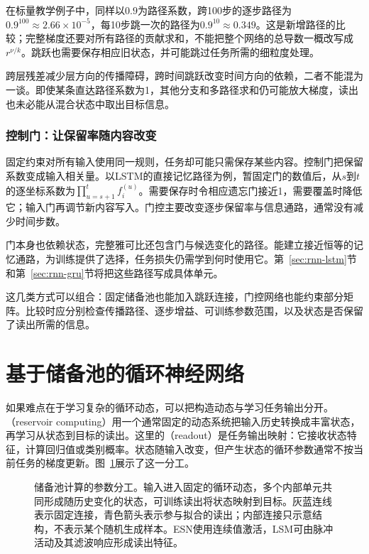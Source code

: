 在标量教学例子中，同样以$0.9$为路径系数，跨100步的逐步路径为$0.9^{100}\approx2.66\times10^{-5}$，每10步跳一次的路径为$0.9^{10}\approx0.349$。这是新增路径的比较；完整梯度还要对所有路径的贡献求和，不能把整个网络的总导数一概改写成$r^{\nu/k}$。跳跃也需要保存相应旧状态，并可能跳过任务所需的细粒度处理。

跨层残差减少层方向的传播障碍，跨时间跳跃改变时间方向的依赖，二者不能混为一谈。即使某条直达路径系数为1，其他分支和多路径求和仍可能放大梯度，读出也未必能从混合状态中取出目标信息。

\subsubsection{控制门：让保留率随内容改变}
\label{sec:rnn-gated-memory-path}

固定约束对所有输入使用同一规则，任务却可能只需保存某些内容。控制门把保留系数变成输入相关量。以LSTM的直接记忆路径为例，暂固定门的数值后，从$s$到$t$的逐坐标系数为$\prod_{u=s+1}^{t}f_i^{(u)}$。需要保存时令相应遗忘门接近1，需要覆盖时降低它；输入门再调节新内容写入。门控主要改变逐步保留率与信息通路，通常没有减少时间步数。

门本身也依赖状态，完整雅可比还包含门与候选变化的路径。能建立接近恒等的记忆通路，为训练提供了选择，任务损失仍需学到何时使用它。第~\ref{sec:rnn-lstm}节和第~\ref{sec:rnn-gru}节将把这些路径写成具体单元。

这几类方式可以组合：固定储备池也能加入跳跃连接，门控网络也能约束部分矩阵。比较时应分别检查传播路径、逐步增益、可训练参数范围，以及状态是否保留了读出所需的信息。

\section{基于储备池的循环神经网络}
\label{sec:rnn-reservoir}

如果难点在于学习复杂的循环动态，可以把构造动态与学习任务输出分开。（reservoir computing）用一个通常固定的动态系统把输入历史转换成丰富状态，再学习从状态到目标的读出。这里的（readout）是任务输出映射：它接收状态特征，计算回归值或类别概率。状态随输入改变，但产生状态的循环参数通常不按当前任务的梯度更新。图~\ref{fig:rnn-reservoir}展示了这一分工。

\begin{figure}[htb]
  \centering
  
  \caption{储备池计算的参数分工。输入进入固定的循环动态，多个内部单元共同形成随历史变化的状态，可训练读出将状态映射到目标。灰蓝连线表示固定连接，青色箭头表示参与拟合的读出；内部连接只示意结构，不表示某个随机生成样本。ESN使用连续值激活，LSM可由脉冲活动及其滤波响应形成读出特征。}
  \label{fig:rnn-reservoir}
\end{figure}

